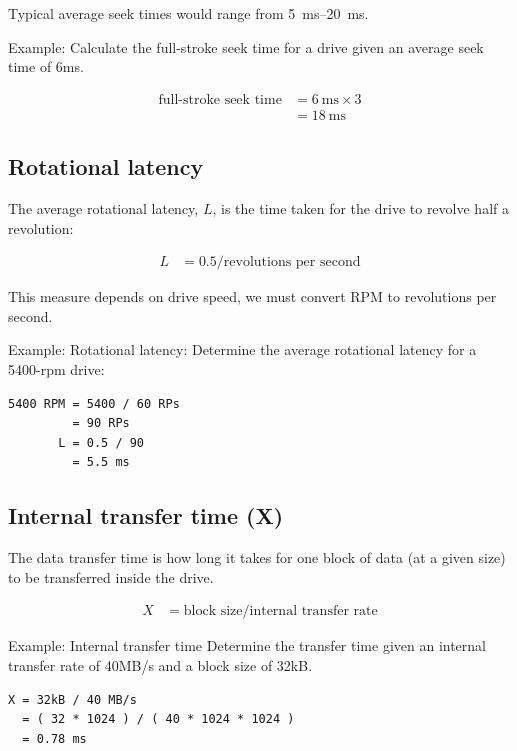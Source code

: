 Typical average seek times would range from \SIrange{5}{20}{\milli\second}.

Example: Calculate the full-stroke seek time for a drive given an average seek time of 6ms.

\begin{align}
  \mbox{full-stroke seek time} & = \SI{6}{\milli\second} \times 3 \\
                               & = \SI{18}{\milli\second}
\end{align}

\subsection{Rotational latency}
\label{sec:rotational-latency}

The average rotational latency, $L$, is the time taken for the drive to revolve half a revolution:

\begin{align}
  L & = 0.5 / \mbox{revolutions per second} \label{eq:rotational-latency}
\end{align}

This measure depends on drive speed, we must convert RPM to revolutions
per second.

Example: Rotational latency: Determine the average rotational latency
for a 5400-rpm drive:

\begin{verbatim}
5400 RPM = 5400 / 60 RPs
         = 90 RPs
       L = 0.5 / 90 
         = 5.5 ms
\end{verbatim}

\subsection{Internal transfer time (X)}\label{internal-transfer-time-x}

The data transfer time is how long it takes for one block of data (at a
given size) to be transferred inside the drive.

\begin{align}
  X & = \mbox{block size} / \mbox{internal transfer rate}
\end{align}

Example: Internal transfer time Determine the transfer time given an internal transfer rate of 40MB/s and a block size of 32kB.

\begin{verbatim}
X = 32kB / 40 MB/s
  = ( 32 * 1024 ) / ( 40 * 1024 * 1024 )
  = 0.78 ms
\end{verbatim}

